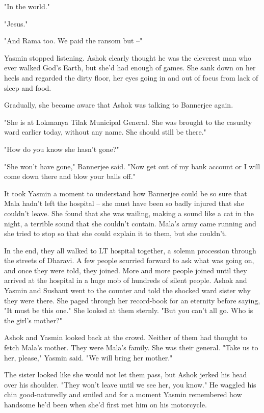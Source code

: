 "In the world."

"Jesus."

"And Rama too. We paid the ransom but --"

Yasmin stopped listening. Ashok clearly thought he was the
cleverest man who ever walked God's Earth, but she'd had enough of
games. She sank down on her heels and regarded the dirty floor, her
eyes going in and out of focus from lack of sleep and food.

Gradually, she became aware that Ashok was talking to Bannerjee
again.

"She is at Lokmanya Tilak Municipal General. She was brought to the
casualty ward earlier today, without any name. She should still be
there."

"How do you know she hasn't gone?"

"She won't have gone," Bannerjee said. "Now get out of my bank
account or I will come down there and blow your balls off."

It took Yasmin a moment to understand how Bannerjee could be so
sure that Mala hadn't left the hospital -- she must have been so
badly injured that she couldn't leave. She found that she was
wailing, making a sound like a cat in the night, a terrible sound
that she couldn't contain. Mala's army came running and she tried
to stop so that she could explain it to them, but she couldn't.

In the end, they all walked to LT hospital together, a solemn
procession through the streets of Dharavi. A few people scurried
forward to ask what was going on, and once they were told, they
joined. More and more people joined until they arrived at the
hospital in a huge mob of hundreds of silent people. Ashok and
Yasmin and Sushant went to the counter and told the shocked ward
sister why they were there. She paged through her record-book for
an eternity before saying, "It must be this one." She looked at
them sternly. "But you can't all go. Who is the girl's mother?"

Ashok and Yasmin looked back at the crowd. Neither of them had
thought to fetch Mala's mother. They were Mala's family. She was
their general. "Take us to her, please," Yasmin said. "We will
bring her mother."

The sister looked like she would not let them pass, but Ashok
jerked his head over his shoulder. "They won't leave until we see
her, you know." He waggled his chin good-naturedly and smiled and
for a moment Yasmin remembered how handsome he'd been when she'd
first met him on his motorcycle.

